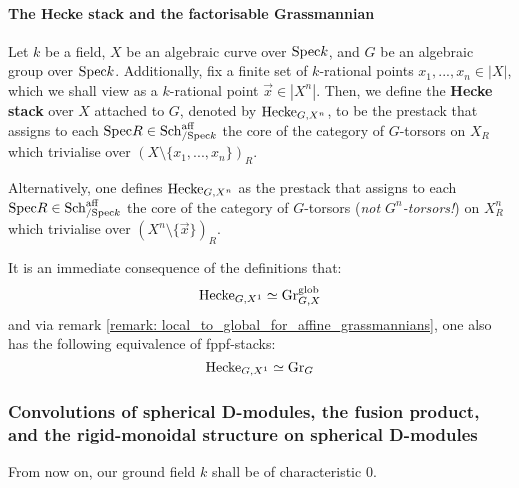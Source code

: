                 \paragraph{The Hecke stack and the factorisable Grassmannian}
                    \begin{definition} \label{def: hecke_stack}
                        Let $k$ be a field, $X$ be an algebraic curve over $\mathrm{Spec} k$, and $G$ be an algebraic group over $\mathrm{Spec} k$. Additionally, fix a finite set of $k$-rational points $x_1, ..., x_n \in |X|$, which we shall view as a $k$-rational point $\vec{x} \in |X^n|$. Then, we define the \textbf{Hecke stack} over $X$ attached to $G$, denoted by $\mathrm{Hecke}_{G, X^n}$, to be the prestack that assigns to each $\mathrm{Spec} R \in \mathrm{Sch}_{/\mathrm{Spec} k}^{\mathrm{aff}}$ the core of the category of $G$-torsors on $X_R$ which trivialise over $(X \setminus \{x_1, ..., x_n\})_R$. 
                        
                        Alternatively, one defines $\mathrm{Hecke}_{G, X^n}$ as the prestack that assigns to each $\mathrm{Spec} R \in \mathrm{Sch}_{/\mathrm{Spec} k}^{\mathrm{aff}}$ the core of the category of $G$-torsors (\textit{not $G^n$-torsors!}) on $X^n_R$ which trivialise over $(X^n \setminus \{\vec{x}\})_R$. 
                    \end{definition}
                    \begin{remark}
                        It is an immediate consequence of the definitions that:
                            $$\mathrm{Hecke}_{G, X^1} \simeq \mathrm{Gr}_{G, X}^{\mathrm{glob}}$$
                        and via remark \ref{remark: local_to_global_for_affine_grassmannians}, one also has the following equivalence of fppf-stacks:
                            $$\mathrm{Hecke}_{G, X^1} \simeq \mathrm{Gr}_G$$
                    \end{remark}
            
            \subsubsection{Convolutions of spherical D-modules, the fusion product, and the rigid-monoidal structure on spherical D-modules}
                \begin{convention}
                    From now on, our ground field $k$ shall be of characteristic $0$.
                \end{convention}
                
